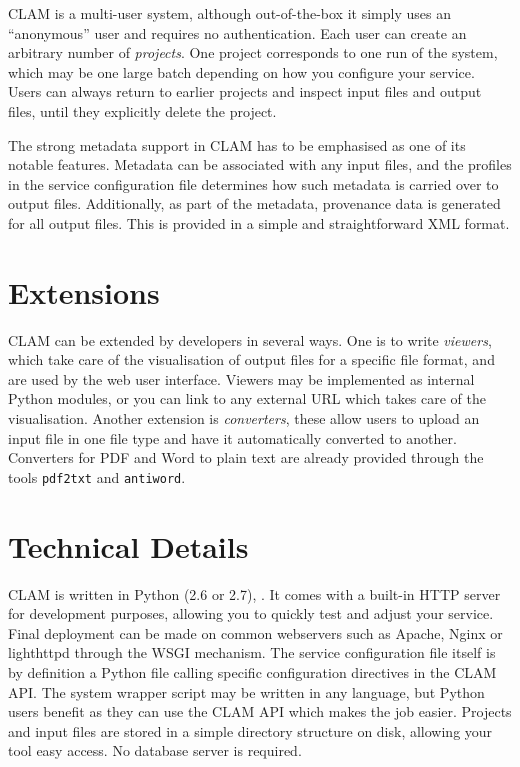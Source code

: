 \documentclass[11pt]{article}
\begin{document}
CLAM is a multi-user system, although out-of-the-box it simply uses an
``anonymous'' user and requires no authentication. Each user can create an
arbitrary number of \emph{projects}. One project corresponds to one run of the
system, which may be one large batch depending on how you configure your
service. Users can always return to earlier projects and inspect input files
and output files, until they explicitly delete the project.

The strong metadata support in CLAM has to be emphasised as one of its notable
features. Metadata can be associated with any input files, and the profiles in
the service configuration file determines how such metadata is carried over to
output files. Additionally, as part of the metadata, provenance data is
generated for all output files. This is provided in a simple and straightforward XML
format.

\section{Extensions}

CLAM can be extended by developers in several ways. One is to write
\emph{viewers}, which take care of the visualisation of output files for a
specific file format, and are used by the web user interface. Viewers may be
implemented as internal Python modules, or you can link to any external URL
which takes care of the visualisation. Another extension is
\emph{converters}, these allow users to upload an input file in one file type and have it
automatically converted to another. Converters for PDF and Word to plain text are already
provided through the tools \texttt{pdf2txt} and \texttt{antiword}.

\section{Technical Details}

CLAM is written in Python (2.6 or 2.7), \cite{PYTHON}. It comes with a built-in HTTP server for
development purposes, allowing you to quickly test and adjust your service.
Final deployment can be made on common webservers such as Apache, Nginx or lighthttpd
through the WSGI mechanism. The service configuration file itself is by
definition a Python file calling specific configuration directives in the CLAM
API. The system wrapper script may be written in any language, but Python users
benefit as they can use the CLAM API which makes the job easier. Projects and
input files are stored in a simple directory structure on disk, allowing your
tool easy access. No database server is required.
\end{document}
